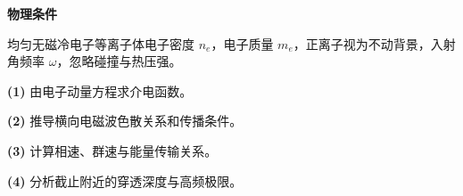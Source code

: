 \textbf{物理条件}\par 均匀无磁冷电子等离子体电子密度 \(n_e\)，电子质量 \(m_e\)，正离子视为不动背景，入射角频率 \(\omega\)，忽略碰撞与热压强。
\par\noindent\textbf{(1)} 由电子动量方程求介电函数。
\par\noindent\textbf{(2)} 推导横向电磁波色散关系和传播条件。
\par\noindent\textbf{(3)} 计算相速、群速与能量传输关系。
\par\noindent\textbf{(4)} 分析截止附近的穿透深度与高频极限。
